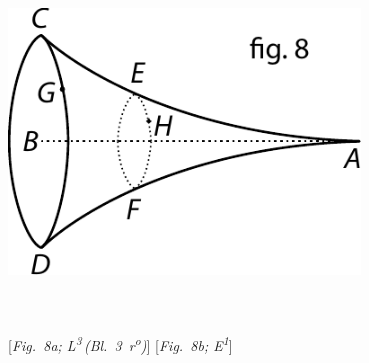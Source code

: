 \hspace{1mm}
\begin{minipage}[t]{0.5\textwidth}
\includegraphics[width=0.7\textwidth]{gesamttex/edit_VIII,3/images/dnr-8b_AE_1684_319-325_d8b.pdf}
\end{minipage}
\\
\\
\hspace*{18mm} [\textit{Fig.~8a; L\textsuperscript{3}\,(Bl.~3~r\textsuperscript{o}\!)}] \label{LH_35_09_14_003r_bis_Fig.8a}\hspace*{42mm} [\textit{Fig.~8b; E\textsuperscript{1}}] \label{AE_1684_325_Fig.8b}
\pend
%
%
%
\pstart%
\phantom{Cfootnote zu Fig. 8}%
\pend
\count{}
\count{}
\count{}%
%
%
%
%
%
%